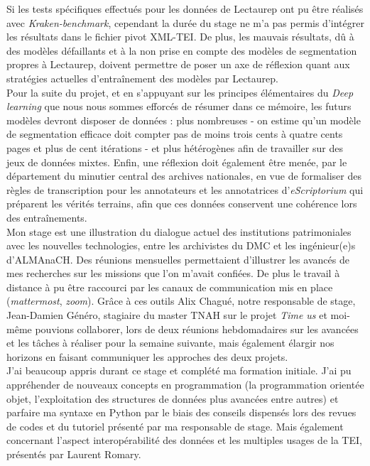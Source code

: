 Si les tests spécifiques effectués pour les données de Lectaurep ont pu être réalisés avec \textit{Kraken-benchmark}, cependant la durée du stage ne m'a pas permis d'intégrer les résultats dans le fichier pivot XML-TEI. De plus, les mauvais résultats, dû à des modèles défaillants et à la non prise en compte des modèles de segmentation propres à Lectaurep, doivent permettre de poser un axe de réflexion quant aux stratégies actuelles d'entraînement des modèles par Lectaurep.\\ 

Pour la suite du projet, et en s'appuyant sur les principes élémentaires du \textit{Deep learning} que nous nous sommes efforcés de résumer dans ce mémoire, les futurs modèles devront disposer de données : plus nombreuses - on estime qu'un modèle de segmentation efficace doit compter pas de moins trois cents à quatre cents pages et plus de cent itérations - et plus hétérogènes afin de travailler sur des jeux de données mixtes. Enfin, une réflexion doit également être menée, par le département du minutier central des archives nationales, en vue de formaliser des règles de transcription pour les annotateurs et les annotatrices d'\textit{eScriptorium} qui préparent les vérités terrains, afin que ces données conservent une cohérence lors des entraînements.\\

Mon stage est une illustration du dialogue actuel des institutions patrimoniales avec les nouvelles technologies, entre les archivistes du DMC et les ingénieur(e)s d'ALMAnaCH. Des réunions mensuelles permettaient d'illustrer les avancés de mes recherches sur les missions que l'on m'avait confiées. De plus le travail à distance à pu être raccourci par les canaux de communication mis en place (\textit{mattermost}, \textit{zoom}). Grâce à ces outils Alix Chagué, notre responsable de stage, Jean-Damien Généro, stagiaire du master TNAH sur le projet \textit{Time us} et moi-même pouvions collaborer, lors de deux réunions hebdomadaires sur les avancées et les tâches à réaliser pour la semaine suivante, mais également élargir nos horizons en faisant communiquer les approches des deux projets.\\

J'ai beaucoup appris durant ce stage et complété ma formation initiale. J'ai pu appréhender de nouveaux concepts en programmation (la programmation orientée objet, l'exploitation des structures de données plus avancées entre autres) et parfaire ma syntaxe en Python par le biais des conseils dispensés lors des revues de codes et du tutoriel présenté par ma responsable de stage. Mais également concernant l'aspect interopérabilité des données et les multiples usages de la TEI, présentés par Laurent Romary.\\  

